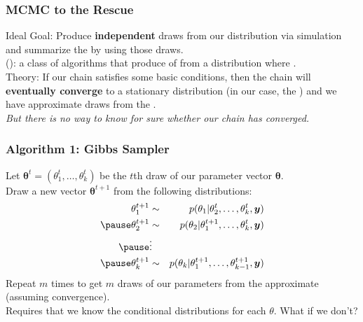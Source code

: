 \documentclass{beamer}
\begin{document}
\begin{frame}
\frametitle{MCMC to the Rescue}
\pause
Ideal Goal: \pause Produce {\bf independent} draws from our 
distribution via simulation and summarize the  by using those
draws. \\
\pause
\bigskip
{}  (): a
class of algorithms that produce  of  from a distribution
where . \\
\pause
\bigskip
Theory: \pause If our chain satisfies some basic conditions, then the chain
will {\bf eventually converge} to a stationary distribution (in our case, the
) \pause and we have approximate draws from the
.\\
\pause
\bigskip
{\it But there is no way to know for sure whether our chain has converged.}
\end{frame}

\begin{frame}
\frametitle{Algorithm 1: Gibbs Sampler}
\pause
Let $\bm{\theta}^t = (\theta_1^t, \dots, \theta_k^t)$ be the $t$th
draw of our parameter vector $\bm{\theta}$.\\
\pause
\bigskip
Draw a new vector $\bm{\theta}^{t+1}$ from the following distributions:
\pause
\begin{eqnarray*}
\theta_1^{t+1} &\sim& p(\theta_1 | \theta_2^t, \dots, \theta_k^t,
\bm{y}) \\
\pause
\theta_2^{t+1} &\sim& p(\theta_2 | \theta_1^{t+1}, \dots, \theta_k^t,
\bm{y}) \\
\pause
&\vdots&\\
\pause
\theta_k^{t+1} &\sim& p(\theta_k | \theta_1^{t+1}, \dots, \theta_{k-1}^{t+1},\bm{y}) \\
\end{eqnarray*}
\pause
Repeat $m$ times to get $m$ draws of our parameters from the
approximate  (assuming convergence). \\
\pause
\bigskip
Requires that we know the conditional distributions for each
$\theta$.  \pause What if we don't?
\end{frame}
\end{document}
